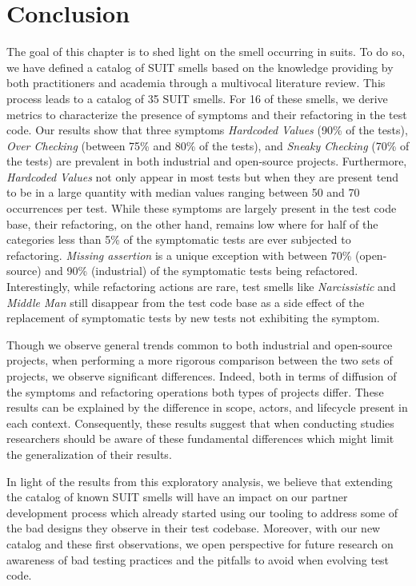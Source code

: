 \section{Conclusion}

The goal of this chapter is to shed light on the smell occurring in \gls{suit}s. To do so, we have defined a catalog of SUIT smells based on the knowledge providing by both practitioners and academia through a multivocal literature review. This process leads to a catalog of 35 SUIT smells. For 16 of these smells, we derive metrics to characterize the presence of symptoms and their refactoring in the test code. Our results show that three symptoms \emph{Hardcoded Values} (90\% of the tests), \emph{Over Checking} (between 75\% and 80\% of the tests), and \emph{Sneaky Checking} (70\% of the tests) are prevalent in both industrial and open-source projects. Furthermore, \emph{Hardcoded Values} not only appear in most tests but when they are present tend to be in a large quantity with median values ranging between 50 and 70 occurrences per test. While these symptoms are largely present in the test code base, their refactoring, on the other hand, remains low where for half of the categories less than 5\% of the symptomatic tests are ever subjected to refactoring. \emph{Missing assertion} is a unique exception with between 70\% (open-source) and 90\% (industrial) of the symptomatic tests being refactored. Interestingly, while refactoring actions are rare, test smells like \emph{Narcissistic} and \emph{Middle Man} still disappear from the test code base as a side effect of the replacement of symptomatic tests by new tests not exhibiting the symptom.

Though we observe general trends common to both industrial and open-source projects, when performing a more rigorous comparison between the two sets of projects, we observe significant differences. Indeed, both in terms of diffusion of the symptoms and refactoring operations both types of projects differ. These results can be explained by the difference in scope, actors, and lifecycle present in each context. Consequently, these results suggest that when conducting studies researchers should be aware of these fundamental differences which might limit the generalization of their results.

In light of the results from this exploratory analysis, we believe that extending the catalog of known SUIT smells will have an impact on our partner development process which already started using our tooling to address some of the bad designs they observe in their test codebase. Moreover, with our new catalog and these first observations, we open perspective for future research on awareness of bad testing practices and the pitfalls to avoid when evolving test code. 